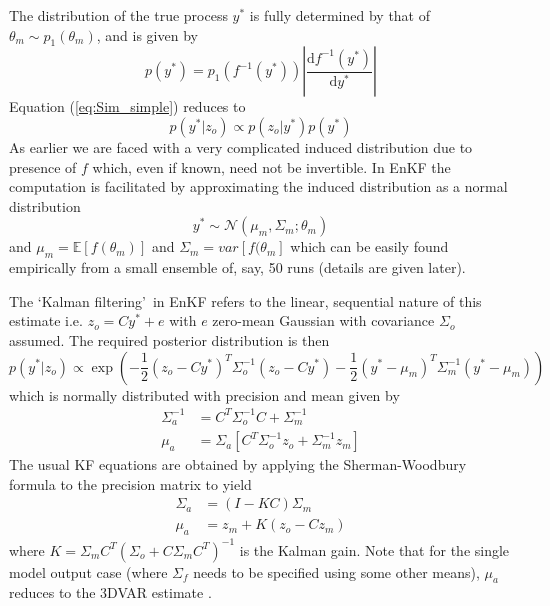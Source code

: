 \documentclass[10pt,a4paper]{article}
\newcommand{\expect} {{\mathbb{E}}}
\newcommand{\intd} {\textrm{d}}
\begin{document}
\noindent The distribution of the true process $y^*$ is fully determined by that of $\theta_m \sim p_1(\theta_m)$, and is given by
\begin{equation}
p(y^*) = p_1(f^{-1}(y^*))\left| \frac{\intd f^{-1}(y^*)}{\intd y^*}\right|
\end{equation}
\noindent Equation (\ref{eq:Sim_simple}) reduces to
\begin{equation}
p(y^*|z_o) \propto  p(z_o | y^*)p(y^*)
\end{equation}
\noindent As earlier we are faced with a very complicated induced distribution due to presence of $f$ which, even if known, need not be invertible. In EnKF the computation is facilitated by approximating the induced distribution as a normal distribution
\begin{equation}
y^* \sim \mathcal{N}(\mu_m,\Sigma_m; \theta_m)
\end{equation}
\noindent and $\mu_m = \expect[f(\theta_m)]$ and $\Sigma_m = var[f(\theta_m]$ which can be easily found empirically from a small ensemble of, say, 50 runs (details are given later).  

The \lq Kalman filtering\rq~in EnKF refers to the linear, sequential nature of this estimate i.e. $z_o = Cy^* + e$ with $e$ zero-mean Gaussian with covariance $\Sigma_o$ assumed.  The required posterior distribution is then
 \begin{equation}
   p(y^* | z_o) \propto \exp\left(-\frac{1}{2}(z_o - Cy^*)^T\Sigma_o^{-1}(z_o - Cy^*) - \frac{1}{2}(y^* - \mu_m)^T\Sigma_m^{-1}(y^* - \mu_m) \right) 
 \end{equation}
\noindent which is normally distributed with precision and mean given by
\begin{align}
\Sigma_a^{-1} &= C^T\Sigma_o^{-1}C + \Sigma_m^{-1} \\
\mu_a &= \Sigma_a[C^T\Sigma_o^{-1}z_o + \Sigma^{-1}_mz_m]
\end{align}
\noindent The usual KF equations are obtained by applying the Sherman-Woodbury formula to the precision matrix to yield
\begin{align}
\Sigma_a &= (I - KC)\Sigma_m \\
\mu_a &= z_m + K(z_o - Cz_m) \label{eq:EnKFmean}
\end{align}
\noindent where $K = \Sigma_mC^T(\Sigma_o + C\Sigma_mC^T)^{-1}$ is the Kalman gain. Note that for the single model output case (where $\Sigma_f$ needs to be specified using some other means), $\mu_a$ reduces to the 3DVAR estimate \citep{Hamill_2000}.
\end{document}
